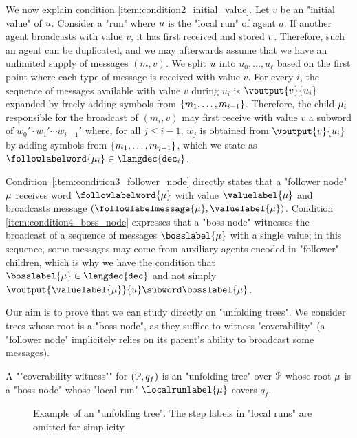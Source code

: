 We now explain condition \ref{item:condition2_initial_value}. Let $v$ be an "initial value" of $u$. Consider a "run" where $u$ is the "local run" of agent $a$. If another agent broadcasts with value $v$, it has first received and stored $v$. Therefore, such an agent can be duplicated, and we may afterwards assume that we have an unlimited supply of messages $(m,v)$.
We split $u$ into $u_0,\dots,u_\ell$ based on the first point where each type of message is received with value $v$. For every $i$, the sequence of messages available with value $v$ during $u_i$ is $\voutput{v}{u_i}$ expanded by freely adding symbols from $\{m_1,\dots, m_{i-1}\}$. Therefore, the child $\mu_i$ responsible for the broadcast of $(m_i,v)$ may first receive with value $v$ a subword of $w_0' \cdot w_1' \cdots w_{i-1}'$ where, for all $j \leq i-1$, $w_j$ is obtained from $\voutput{v}{u_i}$ by adding symbols from $\{m_1, \dots, m_{j-1}\}$, which we state as $\followlabelword{\node_i} \in \langdec{\decsymb_i}$.   

Condition~\ref{item:condition3_follower_node} directly states that a "follower node" $\mu$ receives word $\followlabelword{\node}$ with value $\valuelabel{\node}$ and broadcasts message $(\followlabelmessage{\node}, \valuelabel{\node})$. Condition \ref{item:condition4_boss_node} expresses that a "boss node" witnesses the broadcast of a sequence of messages $\bosslabel{\node}$ with a single value; in this sequence, some messages may come from auxiliary agents encoded in "follower" children, which is why we have the condition that $\bosslabel{\node} \in \langdec{\decsymb}$ and not simply $ \voutput{\valuelabel{\node}}{\localrun} \subword \bosslabel{\node}$. 

Our aim is to prove that we can study \COVER directly on "unfolding trees". We consider trees whose root is a "boss node", as they suffice to witness "coverability"  (a "follower node" implicitely relies on its parent's ability to broadcast some messages). 

\begin{definition}
\label{def:cov_witness}
A ""coverability witness"" for $(\mathcal{P}, q_f)$ is an "unfolding tree" over $\mathcal{P}$ whose root $\mu$ is a "boss node" whose "local run" $\localrunlabel{\node}$ covers $q_f$. 
\end{definition}

\begin{figure}
	\begin{center}
		\resizebox{\textwidth}{!}{
			
		}
	\end{center}
	\caption{Example of an "unfolding tree". The step labels in "local runs" are omitted for simplicity.}\label{fig-ex-unfolding-tree}
\end{figure}

